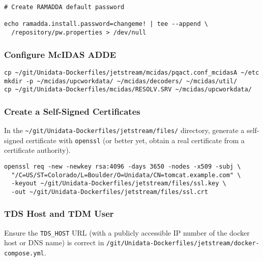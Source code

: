 \documentclass[onecolumn,9pt]{article}
\begin{document}
\lstset{frame=lines,basicstyle=\footnotesize,numbers=left,numberstyle=\tiny,language=sh,label= ,caption= ,captionpos=b}
\begin{lstlisting}
# Create RAMADDA default password

echo ramadda.install.password=changeme! | tee --append \
  /repository/pw.properties > /dev/null
\end{lstlisting}

\subsubsection{Configure McIDAS ADDE}
\label{sec:orgheadline26}

\lstset{frame=lines,basicstyle=\footnotesize,numbers=left,numberstyle=\tiny,language=sh,label= ,caption= ,captionpos=b}
\begin{lstlisting}
cp ~/git/Unidata-Dockerfiles/jetstream/mcidas/pqact.conf_mcidasA ~/etc
mkdir -p ~/mcidas/upcworkdata/ ~/mcidas/decoders/ ~/mcidas/util/
cp ~/git/Unidata-Dockerfiles/mcidas/RESOLV.SRV ~/mcidas/upcworkdata/
\end{lstlisting}

\subsubsection{Create a Self-Signed Certificates}
\label{sec:orgheadline27}

In the \texttt{\textasciitilde{}/git/Unidata-Dockerfiles/jetstream/files/} directory, generate a self-signed certificate with \texttt{openssl} (or better yet, obtain a real certificate from a certificate authority).

\lstset{frame=lines,basicstyle=\footnotesize,numbers=left,numberstyle=\tiny,language=sh,label= ,caption= ,captionpos=b}
\begin{lstlisting}
openssl req -new -newkey rsa:4096 -days 3650 -nodes -x509 -subj \
  "/C=US/ST=Colorado/L=Boulder/O=Unidata/CN=tomcat.example.com" \
  -keyout ~/git/Unidata-Dockerfiles/jetstream/files/ssl.key \
  -out ~/git/Unidata-Dockerfiles/jetstream/files/ssl.crt
\end{lstlisting}

\subsubsection{TDS Host and TDM User}
\label{sec:orgheadline28}

Ensure the \texttt{TDS\_HOST} URL (with a publicly accessible IP number of the docker host or DNS name) is correct in \texttt{/git/Unidata-Dockerfiles/jetstream/docker-compose.yml}. 
\end{document}
